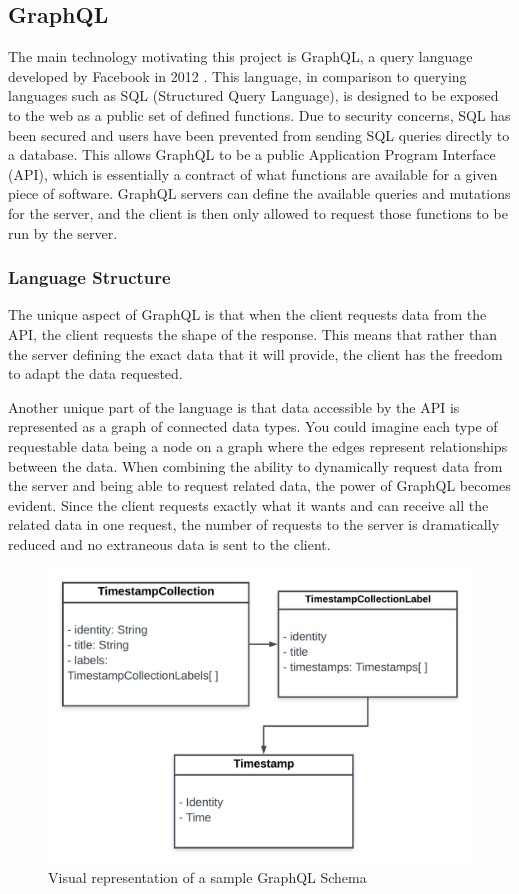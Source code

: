 \subsection{GraphQL}
The main technology motivating this project is GraphQL, a query language developed by Facebook in 2012 \cite{byronKeynoteBriefHistory2019}.  This language, in comparison to querying languages such as SQL (Structured Query Language), is designed to be exposed to the web as a public set of defined functions.  Due to security concerns, SQL has been secured and users have been prevented from sending SQL queries directly to a database.  This allows GraphQL to be a public Application Program Interface (API), which is essentially a contract of what functions are available for a given piece of software.  GraphQL servers can define the available queries and mutations for the server, and the client is then only allowed to request those functions to be run by the server.

\subsubsection{Language Structure}

The unique aspect of GraphQL is that when the client requests data from the API, the client requests the shape of the response.  This means that rather than the server defining the exact data that it will provide, the client has the freedom to adapt the data requested.

Another unique part of the language is that data accessible by the API is represented as a graph of connected data types.  You could imagine each type of requestable data being a node on a graph where the edges represent relationships between the data.  When combining the ability to dynamically request data from the server and being able to request related data, the power of GraphQL becomes evident.  Since the client requests exactly what it wants and can receive all the related data in one request, the number of requests to the server is dramatically reduced and no extraneous data is sent to the client.

\begin{figure}[htbp]
    \centering
    \includegraphics[scale=.15]{img/schema-graph.png}
    \caption{Visual representation of a sample GraphQL Schema}
    \label{fig:schema-graph}
\end{figure}

